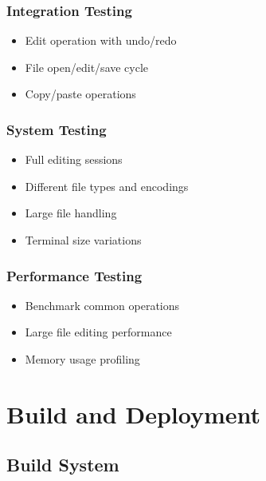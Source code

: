 \documentclass[12pt,a4paper,oneside,openany]{report}
\begin{document}
\subsection{Integration Testing}

\begin{itemize}
	\item Edit operation with undo/redo
	\item File open/edit/save cycle
	\item Copy/paste operations
\end{itemize}

\subsection{System Testing}

\begin{itemize}
	\item Full editing sessions
	\item Different file types and encodings
	\item Large file handling
	\item Terminal size variations
\end{itemize}

\subsection{Performance Testing}

\begin{itemize}
	\item Benchmark common operations
	\item Large file editing performance
	\item Memory usage profiling
\end{itemize}

\chapter{Build and Deployment}

\section{Build System}
\end{document}
